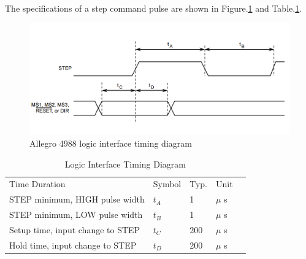 The specifications of a step command pulse are shown in Figure.\ref{fig:allegro_4988_logic_interface_timing_diagram} and Table.\ref{tab:allegro_4988_logic_interface_timing_diagram}.
\begin{figure}[H]
	\centering
	\includegraphics[width=\maxwidth{10cm}, keepaspectratio]{Chapters/Fig/allegro_4988_logic_interface_timing_diagram.png}
	\caption{Allegro 4988 logic interface timing diagram\cite{A4988_allegro_thesis}}
	\label{fig:allegro_4988_logic_interface_timing_diagram}
\end{figure}

\begin{table}[H]
	\centering
	\caption{Logic Interface Timing Diagram\cite{A4988_allegro_thesis}}
	\label{tab:allegro_4988_logic_interface_timing_diagram}
	\begin{tabular}{|l|l|l|l|l}
	\cline{1-4}
	Time Duration                    & Symbol 	   & Typ. & Unit 	 &  \\ \cline{1-4}
	STEP minimum, HIGH pulse width   & $t_{A}$     & 1    & $\mu$ s   &  \\ \cline{1-4}
	STEP minimum, LOW pulse width    & $t_{B}$     & 1    & $\mu$ s   &  \\ \cline{1-4}
	Setup time, input change to STEP & $t_{C}$     & 200  & $\mu$ s   &  \\ \cline{1-4}
	Hold time, input change to STEP  & $t_{D}$     & 200  & $\mu$ s   &  \\ \cline{1-4}
	\end{tabular}
\end{table}

